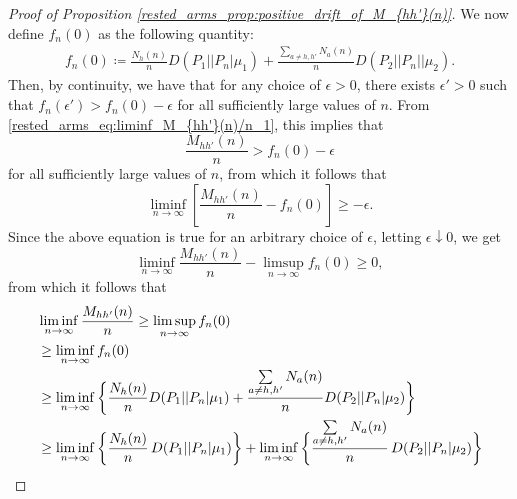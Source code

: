 \begin{proof}[Proof of Proposition \ref{rested_arms_prop:positive_drift_of_M_{hh'}(n)}]
We now define $f_n(0)$ as the following quantity:
\begingroup\allowdisplaybreaks\begin{align}
	f_n(0)\coloneqq\frac{N_h(n)}{n}D(P_1||P_n|\mu_1)+\frac{\sum\limits_{a\neq h,h'}N_a(n)}{n}D(P_2||P_n||\mu_2).\label{rested_arms_eq:f_n(0)}
\end{align}\endgroup
Then, by continuity, we have that for any choice of $\epsilon>0$, there exists $\epsilon'>0$ such that $f_n(\epsilon')>f_n(0)-\epsilon$ for all sufficiently large values of $n$. From \eqref{rested_arms_eq:liminf_M_{hh'}(n)/n_1}, this implies that
\begin{equation}
	\frac{M_{hh'}(n)}{n}> f_{n}(0)-\epsilon
\end{equation}
for all sufficiently large values of $n$, from which it follows that
\begin{equation}
	\liminf\limits_{n\to\infty}\left[\frac{M_{hh'}(n)}{n}-f_n(0)\right]\geq  -\epsilon.
\end{equation}
Since the above equation is true for an arbitrary choice of $\epsilon$, letting $\epsilon\downarrow 0$, we get
\begin{equation}
	\liminf\limits_{n\to\infty} \frac{M_{hh'}(n)}{n}-\limsup\limits_{n\to\infty}f_n(0)\geq  0,
\end{equation}
from which it follows that
\begingroup\allowdisplaybreaks\begin{align}
	&\liminf\limits_{n\to\infty}\frac{M_{hh'}(n)}{n}\geq  \limsup\limits_{n\to\infty}f_n(0)\nonumber\\
	&\geq \liminf\limits_{n\to\infty}f_n(0)\nonumber\\
	&\geq \liminf\limits_{n\to\infty}\bigg\lbrace\frac{N_h(n)}{n}D(P_1||P_n|\mu_1)+\frac{\sum\limits_{a\neq h,h'}N_a(n)}{n}D(P_2||P_n|\mu_2)\bigg\rbrace\nonumber\\
	&\geq \liminf\limits_{n\to\infty}\bigg\lbrace\frac{N_h(n)}{n}\,D(P_1||P_n|\mu_1)\bigg\rbrace+\liminf\limits_{n\to\infty}\bigg\lbrace\frac{\sum\limits_{a\neq{h,h'}}N_a(n)}{n}\,D(P_2||P_n|\mu_2)\bigg\rbrace
	\label{rested_arms_eq:liminf_M_{hh'}(n)/n_strictly_positive}

\end{align}
\end{proof}
